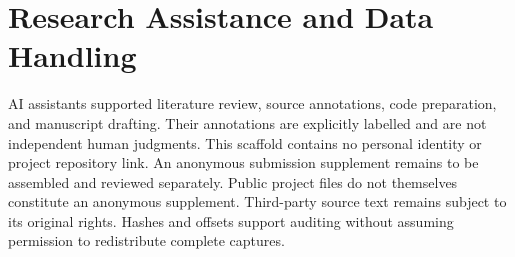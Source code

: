 \documentclass[11pt]{article}
\begin{document}
\section*{Research Assistance and Data Handling}

AI assistants supported literature review, source annotations, code preparation, and manuscript drafting.
Their annotations are explicitly labelled and are not independent human judgments.
This scaffold contains no personal identity or project repository link.
An anonymous submission supplement remains to be assembled and reviewed separately.
Public project files do not themselves constitute an anonymous supplement.
Third-party source text remains subject to its original rights.
Hashes and offsets support auditing without assuming permission to redistribute complete captures.


\end{document}
